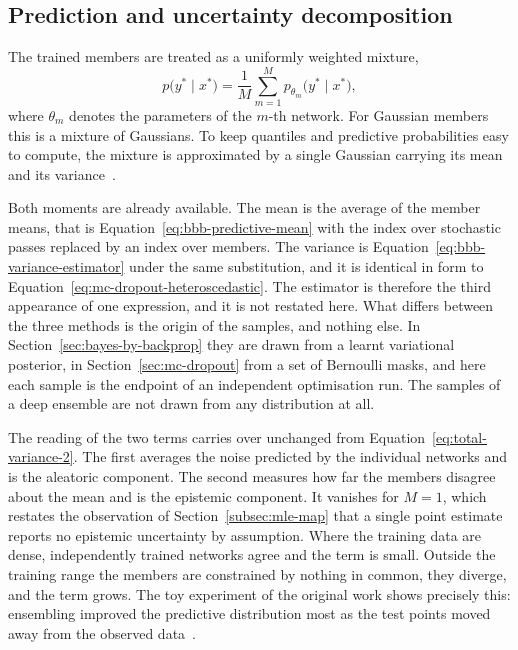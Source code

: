 \subsection{Prediction and uncertainty decomposition}
\label{subsec:ensembles-prediction}

The trained members are treated as a uniformly weighted mixture,
%
\begin{equation}
    p\bigl(y^\ast \mid x^\ast\bigr)
    = \frac{1}{M} \sum_{m=1}^{M}
      p_{\theta_m}\bigl(y^\ast \mid x^\ast\bigr) ,
    \label{eq:ensemble-mixture}
\end{equation}
%
where $\theta_m$ denotes the parameters of the $m$-th network. For Gaussian
members this is a mixture of Gaussians. To keep quantiles and predictive
probabilities easy to compute, the mixture is approximated by a single Gaussian
carrying its mean and its variance~\cite{lakshminarayanan2017}.

Both moments are already available. The mean is the average of the member means,
that is Equation~\eqref{eq:bbb-predictive-mean} with the index over stochastic
passes replaced by an index over members. The variance is
Equation~\eqref{eq:bbb-variance-estimator} under the same substitution, and it
is identical in form to Equation~\eqref{eq:mc-dropout-heteroscedastic}. The
estimator is therefore the third appearance of one expression, and it is not
restated here. What differs between the three methods is the origin of the
samples, and nothing else. In Section~\ref{sec:bayes-by-backprop} they are drawn
from a learnt variational posterior, in Section~\ref{sec:mc-dropout} from a set
of Bernoulli masks, and here each sample is the endpoint of an independent
optimisation run. The samples of a deep ensemble are not drawn from any
distribution at all.


The reading of the two terms carries over unchanged from
Equation~\eqref{eq:total-variance-2}. The first averages the noise predicted by
the individual networks and is the aleatoric component. The second measures how
far the members disagree about the mean and is the epistemic component. It
vanishes for $M = 1$, which restates the observation of
Section~\ref{subsec:mle-map} that a single point estimate reports no epistemic
uncertainty by assumption. Where the training data are dense, independently
trained networks agree and the term is small. Outside the training range the
members are constrained by nothing in common, they diverge, and the term grows.
The toy experiment of the original work shows precisely this: ensembling
improved the predictive distribution most as the test points moved away from the
observed data~\cite{lakshminarayanan2017}.

